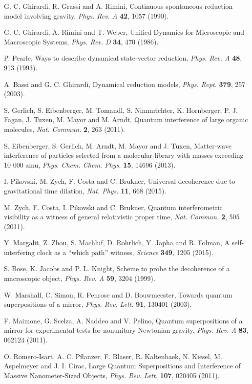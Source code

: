 \documentclass{ws-procs961x669}            %
\begin{document}
\begin{thebibliography}{10}
G. C. Ghirardi, R. Grassi and A. Rimini, Continuous spontaneous reduction model involving gravity,  {\em Phys. Rev. A} {\bf 42}, 1057 (1990).

G. C. Ghirardi, A. Rimini and T. Weber, Unified Dynamics for Microscopic and Macroscopic Systems,  {\em Phys. Rev. D} {\bf 34}, 470 (1986).

P. Pearle, Ways to describe dynamical state-vector reduction,  {\em Phys. Rev. A} {\bf 48}, 913 (1993).

A. Bassi and G. C. Ghirardi, Dynamical reduction models, {\em Phys. Rept.} {\bf 379}, 257 (2003).

S. Gerlich, S. Eibenberger, M. Tomandl, S. Nimmrichter, K. Hornberger, P. J. Fagan, J. Tuxen, M. Mayor and M. Arndt, Quantum interference of large organic molecules, {\em Nat. Commun.} {\bf 2}, 263 (2011).

S. Eibenberger, S. Gerlich, M. Arndt, M. Mayor and J. Tuxen, Matter-wave interference of particles selected from a
molecular library with masses exceeding 10 000 amu, {\em Phys. Chem. Chem. Phys.} {\bf 15}, 14696 (2013).

I. Pikovski, M. Zych, F. Costa and C. Brukner, Universal decoherence due to gravitational time dilation, {\em Nat. Phys.} {\bf
11}, 668 (2015).

M. Zych, F. Costa, I. Pikovski and C. Brukner, Quantum interferometric visibility as a witness of general relativistic
proper time, {\em Nat. Commun.} {\bf 2}, 505 (2011).

Y. Margalit, Z. Zhou, S. Machluf, D. Rohrlich, Y. Japha and R. Folman, A self-interfering clock as a ``which path''
witness, {\em Science} {\bf 349}, 1205 (2015).

S. Bose, K. Jacobs and P. L. Knight, Scheme to probe the decoherence of a macroscopic object, {\em Phys. Rev. A} {\bf 59}, 3204 (1999).

W. Marshall, C.  Simon, R. Penrose and D. Bouwmeester, Towards quantum superpositions of a mirror, {\em Phys. Rev.
Lett.} {\bf 91}, 130401 (2003).

F. Maimone, G. Scelza, A. Naddeo and V. Pelino, Quantum superpositions of a mirror for experimental tests for nonunitary
Newtonian gravity, {\em Phys. Rev. A} {\bf 83}, 062124 (2011).

O. Romero-Isart, A. C. Pflanzer, F. Blaser, R. Kaltenbaek, N. Kiesel, M. Aspelmeyer and J. I. Cirac, Large Quantum
Superpositions and Interference of Massive Nanometer-Sized Objects, {\em Phys.  Rev.  Lett.} {\bf 107}, 020405 (2011).


\end{thebibliography}
\end{document}
